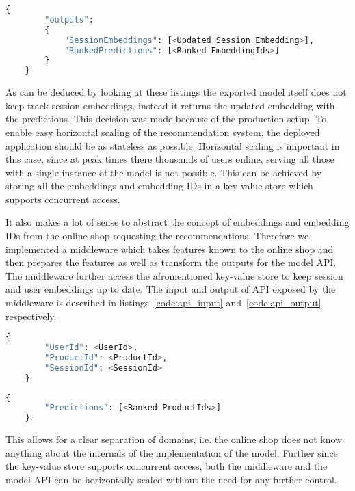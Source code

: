\begin{minipage}{\linewidth}
    \begin{lstlisting}[language=Python,frame=single,caption=TF Serve API Output,label=code:tf_serve_output]
    {
        "outputs": 
        {
            "SessionEmbeddings": [<Updated Session Embedding>],
            "RankedPredictions": [<Ranked EmbeddingIds>]
        }
    }
    \end{lstlisting}
\end{minipage}

As can be deduced by looking at these listings the exported model itself does not keep track session embeddings, instead it returns the updated embedding with the predictions.
This decision was made because of the production setup.
To enable easy horizontal scaling of the recommendation system, the deployed application should be as stateless as possible.
Horizontal scaling is important in this case, since at peak times there thousands of users online, serving all those with a single instance of the model is not possible.
This can be achieved by storing all the embeddings and embedding IDs in a key-value store which supports concurrent access.
\par
It also makes a lot of sense to abstract the concept of embeddings and embedding IDs from the online shop requesting the recommendations.
Therefore we implemented a middleware which takes features known to the online shop and then prepares the features as well as transform the outputs for the model API.
The middleware further access the afromentioned key-value store to keep session and user embeddings up to date.
The input and output of API exposed by the middleware is described in listings~\ref{code:api_input} and~\ref{code:api_output} respectively.

\begin{minipage}{\linewidth}
    \begin{lstlisting}[language=Python,frame=single,caption=Middleware API Input,label=code:api_input]
    {
        "UserId": <UserId>,
        "ProductId": <ProductId>,
        "SessionId": <SessionId>
    }
    \end{lstlisting}
\end{minipage}

\begin{minipage}{\linewidth}
    \begin{lstlisting}[language=Python,frame=single,caption=Middleware API Output,label=code:api_output]
    {
        "Predictions": [<Ranked ProductIds>]
    }
    \end{lstlisting}
\end{minipage}
This allows for a clear separation of domains, i.e. the online shop does not know anything about the internals of the implementation of the model.
Further since the key-value store supports concurrent access, both the middleware and the model API can be horizontally scaled without the need for any further control.
